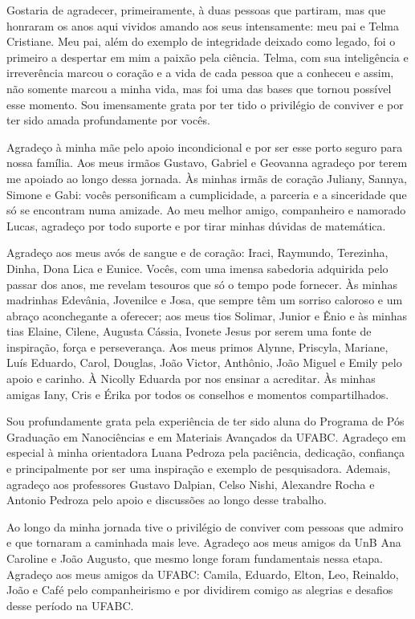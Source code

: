\begin{agradecimentos}
Gostaria de agradecer, primeiramente, à duas pessoas que partiram, mas que honraram os anos aqui vividos amando aos seus intensamente: meu pai e Telma Cristiane. Meu pai, além do exemplo de integridade deixado como legado, foi o primeiro a despertar em mim a paixão pela ciência. Telma, com sua inteligência e irreverência marcou o coração e a vida de cada pessoa que a conheceu e assim, não somente marcou a minha vida, mas foi uma das bases que tornou possível esse momento. Sou imensamente grata por ter tido o privilégio de conviver e por ter sido amada profundamente por vocês. 

Agradeço à minha mãe pelo apoio incondicional e por ser esse porto seguro para nossa família. Aos meus irmãos Gustavo, Gabriel e Geovanna agradeço por terem me apoiado ao longo dessa jornada. Às minhas irmãs de coração Juliany, Sannya, Simone e Gabi: vocês personificam a cumplicidade, a parceria e a sinceridade que só se encontram numa amizade. Ao meu melhor amigo, companheiro e namorado Lucas, agradeço por todo suporte e por tirar minhas dúvidas de matemática. 

Agradeço aos meus avós de sangue e de coração: Iraci, Raymundo, Terezinha, Dinha, Dona Lica e Eunice. Vocês, com uma imensa sabedoria adquirida pelo passar dos anos, me revelam tesouros que só o tempo pode fornecer. Às minhas madrinhas Edevânia, Jovenilce e Josa, que sempre têm um sorriso caloroso e um abraço aconchegante a oferecer; aos meus tios Solimar, Junior e Ênio e às minhas tias Elaine, Cilene, Augusta Cássia, Ivonete Jesus por serem uma fonte de inspiração, força e perseverança. Aos meus primos Alynne, Priscyla, Mariane, Luís Eduardo, Carol, Douglas, João Victor, Anthônio, João Miguel e Emily pelo apoio e carinho. À Nicolly Eduarda por nos ensinar a acreditar. Às minhas amigas Iany, Cris e Érika por todos os conselhos e momentos compartilhados.

Sou profundamente grata pela experiência de ter sido aluna do Programa de Pós Graduação em Nanociências e em Materiais Avançados da UFABC. Agradeço em especial à minha orientadora Luana Pedroza pela paciência, dedicação, confiança e principalmente por ser uma inspiração e exemplo de pesquisadora. Ademais, agradeço aos professores Gustavo Dalpian, Celso Nishi, Alexandre Rocha e Antonio Pedroza pelo apoio e discussões ao longo desse trabalho.

Ao longo da minha jornada tive o privilégio de conviver com pessoas que admiro e que tornaram a caminhada mais leve. Agradeço aos meus amigos da UnB Ana Caroline e João Augusto, que mesmo longe foram fundamentais nessa etapa. Agradeço aos meus amigos da UFABC: Camila, Eduardo, Elton, Leo, Reinaldo, João e Café pelo companheirismo e por dividirem comigo as alegrias e desafios desse período na UFABC. 


\end{agradecimentos}
